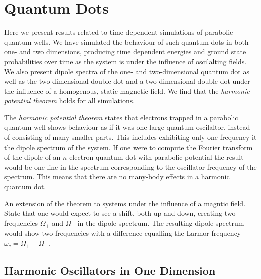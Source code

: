 \chapter{Quantum Dots}

Here we present results related to time-dependent simulations of parabolic quantum
wells. We have simulated the behaviour of such quantum dots in both one- and two 
dimensions, producing time dependent energies and ground state probabilities over
time as the system is under the influence of oscilalting fields. We also present 
dipole spectra of the one- and two-dimensional quantum dot as well as the 
two-dimensional double dot and a two-dimensional double dot under the influence of
a homogenous, static magnetic field. We find that the \emph{harmonic potential theorem}
holds for all simulations.

The \emph{harmonic potential theorem}\cite{kohn1961cyclotron}
states that electrons trapped in a parabolic quantum well shows behaviour as if it 
was one large quantum oscilaltor, instead of consisting of many smaller parts. This 
includes exhibiting only one frequency it the dipole spectrum of the system. If one 
were to compute the Fourier transform of the dipole of an $n$-electron quantum dot with 
parabolic potential the result would be one line in the spectrum corresponding to the
oscillator frequency of the spectrum. This means that there are no many-body effects 
in a harmonic quantum dot.

An extension of the theorem to systems under the influence 
of a magntic field\cite{brey1989optical}. State that one would expect to see a shift,
both up and down, creating two frequencies $\Omega_+$ and $\Omega_-$ in the dipole 
spectrum. The resulting dipole spectrum would show two frequencies with a difference 
equalling the Larmor frequency $\omega_c = \Omega_+ - \Omega_-$.

\section{Harmonic Oscillators in One Dimension}

